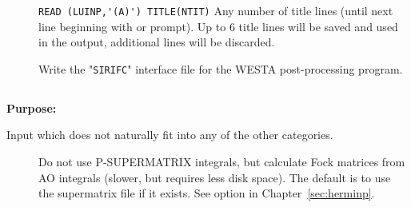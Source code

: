\begin{description}
\item[] 
  \verb"READ (LUINP,'(A)') TITLE(NTIT)" 
  Any number of title lines (until next line beginning with
   or \quotekw{*} prompt).
  Up to 6 title lines will be saved and used in the output, additional
  lines will be discarded.

\item[]
  Write the "\verb|SIRIFC|" interface file for the WESTA post-processing program.

\end{description}




\pagebreak[3]
\subsection{\label{ref-auxinp}}

{\bf Purpose:}

Input which does not naturally fit into any of the other
categories.

\begin{description}
\item[]
  Do not use P-SUPERMATRIX integrals, but calculate Fock matrices
  from AO integrals (slower, but requires less disk space). The
  default is to use the supermatrix file if it exists. See option
   in Chapter~\ref{sec:herminp}.

\end{description}

